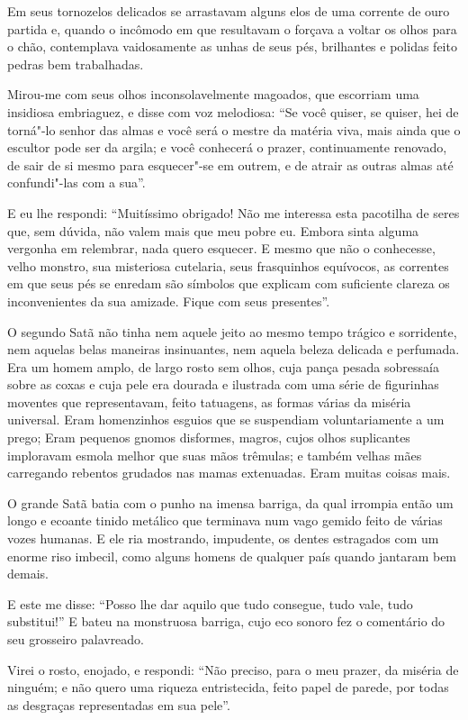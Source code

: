 Em seus tornozelos delicados se arrastavam alguns elos de uma corrente
de ouro partida e, quando o incômodo em que resultavam o forçava a
voltar os olhos para o chão, contemplava vaidosamente as unhas de
seus pés, brilhantes e polidas feito pedras bem trabalhadas.

Mirou-me com seus olhos inconsolavelmente magoados, que
escorriam uma insidiosa embriaguez, e disse com voz melodiosa:
“Se você quiser, se quiser, hei de torná"-lo senhor das
almas e você será o mestre da matéria viva, mais ainda que o
escultor pode ser da argila; e você conhecerá o prazer,
continuamente renovado, de sair de si mesmo para esquecer"-se em
outrem, e de atrair as outras almas até confundi"-las com a
sua”.

E eu lhe respondi: “Muitíssimo obrigado! Não me interessa
esta pacotilha de seres que, sem dúvida, não valem mais que meu
pobre eu. Embora sinta alguma vergonha em relembrar, nada quero
esquecer. E mesmo que não o conhecesse, velho monstro, sua misteriosa
cutelaria, seus frasquinhos equívocos, as correntes em que seus pés se
enredam são símbolos que explicam com suficiente clareza os
inconvenientes da sua amizade. Fique com seus presentes”.

O segundo Satã não tinha nem aquele jeito ao mesmo tempo trágico e
sorridente, nem aquelas belas maneiras insinuantes, nem aquela beleza
delicada e perfumada. Era um homem amplo, de largo rosto sem olhos,
cuja pança pesada sobressaía sobre as coxas e cuja pele era
dourada e ilustrada com uma série de figurinhas
moventes que representavam, feito tatuagens, as formas várias da miséria universal. Eram
homenzinhos esguios que se suspendiam voluntariamente a um prego; Eram
pequenos gnomos disformes, magros, cujos olhos suplicantes imploravam
esmola melhor que suas mãos trêmulas; e também velhas mães
carregando rebentos grudados nas mamas extenuadas. Eram muitas coisas
mais.

O grande Satã batia com o punho na imensa barriga, da qual irrompia
então um longo e ecoante tinido metálico que terminava num vago
gemido feito de várias vozes humanas. E ele ria mostrando,
impudente, os dentes estragados com um enorme riso imbecil, como
alguns homens de qualquer país quando jantaram bem demais.

E este me disse: ``Posso lhe dar aquilo que tudo
consegue, tudo vale, tudo substitui!'' E bateu na
monstruosa barriga, cujo eco sonoro fez o comentário do seu grosseiro
palavreado.

Virei o rosto, enojado, e respondi: ``Não preciso, para o meu
prazer, da miséria de ninguém; e não quero uma riqueza entristecida, feito
papel de parede, por todas as desgraças representadas em sua
pele''.

